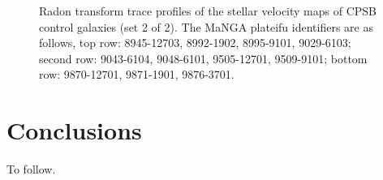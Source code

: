 \documentclass[fleqn,usenatbib]{mnras}
\begin{document}
\begin{figure}
    \caption{Radon transform trace profiles of the stellar velocity maps of CPSB control galaxies (set 2 of 2). The MaNGA plateifu identifiers are as follows, top row: 8945-12703, 8992-1902, 8995-9101, 9029-6103; second row: 9043-6104, 9048-6101, 9505-12701, 9509-9101; bottom row: 9870-12701, 9871-1901, 9876-3701.}
    \label{fig:Radon-traces-CPSB-controls-2}
\end{figure}


\section{Conclusions}

To follow.










%




\bsp	%
\label{lastpage}
\end{document}
